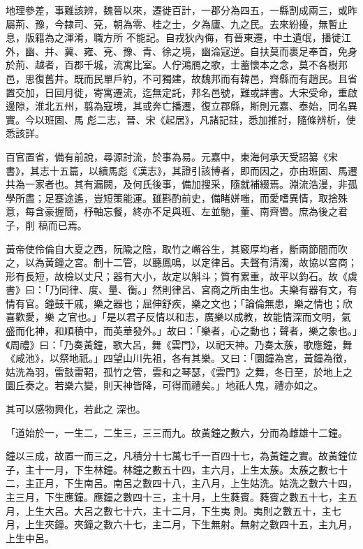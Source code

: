 \begin{pinyinscope}
 地理參差，事難該辨，魏晉以來，遷徙百計，一郡分為四五，一縣割成兩三，或昨屬荊、豫，今隸司、兗，朝為零、桂之士，夕為廬、九之民。去來紛擾，無暫止息，版籍為之渾淆，職方所
 不能記。自戎狄內侮，有晉東遷，中土遺氓，播徙江外，幽、并、冀、雍、兗、豫、青、徐之境，幽淪寇逆。自扶莫而裹足奉首，免身於荊、越者，百郡千城，流寓比室。人佇鴻鴈之歌，士蓄懷本之念，莫不各樹邦邑，思復舊井。既而民單戶約，不可獨建，故魏邦而有韓邑，齊縣而有趙民。且省置交加，日回月徙，寄寓遷流，迄無定託，邦名邑號，難或詳書。大宋受命，重啟邊隙，淮北五州，翦為寇境，其或奔亡播遷，復立郡縣，斯則元嘉、泰始，同名異實。今以班固、馬
 彪二志，晉、宋《起居》，凡諸記註，悉加推討，隨條辨析，使悉該詳。



 百官置省，備有前說，尋源討流，於事為易。元嘉中，東海何承天受詔纂《宋書》，其志十五篇，以續馬彪《漢志》，其證引該博者，即而因之，亦由班固、馬遷共為一家者也。其有漏闕，及何氏後事，備加搜采，隨就補綴焉。淵流浩漫，非孤學所盡；足蹇途遙，豈短策能運。雖斟酌前史，備睹姘嗤，而愛嗜異情，取捨殊意，每含豪握簡，杼軸忘餐，終亦不足與班、左並馳，董、南齊轡。庶為後之君子，削
 稿而已焉。



 黃帝使伶倫自大夏之西，阮隃之陰，取竹之嶰谷生，其竅厚均者，斷兩節間而吹之，以為黃鐘之宮。制十二管，以聽鳳鳴，以定律呂。夫聲有清濁，故協以宮商；形有長短，故檢以丈尺；器有大小，故定以斛斗；質有累重，故平以鈞石。故《虞書》曰：「乃同律、度、量、衡。」然則律呂、宮商之所由生也。夫樂有器有文，有情有官。鐘鼓干戚，樂之器也；屈伸舒疾，樂之文也；「論倫無患，樂之情也；欣喜歡愛，樂
 之官也。」「是以君子反情以和志，廣樂以成教，故能情深而文明，氣盛而化神，和順積中，而英華發外。」故曰：「樂者，心之動也；聲者，樂之象也。」《周禮》曰：「乃奏黃鐘，歌大呂，舞《雲門》，以祀天神。乃奏太蔟，歌應鐘，舞《咸池》，以祭地祇。」四望山川先祖，各有其樂。又曰：「圜鐘為宮，黃鐘為徵，姑洗為羽，雷鼓雷鞀，孤竹之管，雲和之琴瑟，《雲門》之舞，冬日至，於地上之圜丘奏之。若樂六變，則天神皆降，可得而禮矣。」地祇人鬼，禮亦如之。



 其可以感物興化，若此之
 深也。



 「道始於一，一生二，二生三，三三而九。故黃鐘之數六，分而為雌雄十二鐘。



 鐘以三成，故置一而三之，凡積分十七萬七千一百四十七，為黃鐘之實。故黃鐘位子，主十一月，下生林鐘。林鐘之數五十四，主六月，上生太蔟。太蔟之數七十二，主正月，下生南呂。南呂之數四十八，主八月，上生姑洗。姑洗之數六十四，主三月，下生應鐘。應鐘之數四十三，主十月，上生蕤賓。蕤賓之數五十七，主五月，上生大呂。大呂之數七十六，主十二月，下生夷
 則。夷則之數五十，主七月，上生夾鐘。夾鐘之數六十七，主二月，下生無射。無射之數四十五，主九月，上生中呂。



\end{pinyinscope}
